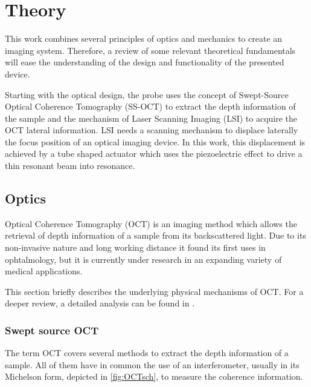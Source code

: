 
\chapter{Theory}
\label{Ch:Theory}	

This work combines several principles of optics and mechanics to create an imaging system. Therefore, a review of some relevant theoretical fundamentals will ease the understanding of the design and functionality of the presented device.

Starting with the optical design, the probe uses the concept of Swept-Source Optical Coherence Tomography (SS-OCT) to extract the depth information of the sample and the mechanism of Laser Scanning Imaging (LSI) to acquire the OCT lateral information. LSI needs a scanning mechanism to displace laterally the focus position of an optical imaging device. In this work, this displacement is achieved by a tube shaped actuator which uses the piezoelectric effect to drive a thin resonant beam into resonance.

\section{Optics}
Optical Coherence Tomography (OCT) is an imaging method which allows the retrieval of depth information of a sample from its backscattered light.  Due to its non-invasive nature and long working distance it found its first uses in ophtalmology, but it is currently under research in an expanding variety of medical applications. 

This section briefly describes the underlying physical mechanisms of OCT. For a deeper review, a detailed analysis can be found in \cite{Drexler2008}.

\subsection{Swept source OCT}
The term OCT covers several methods to extract the depth information of a sample. All of them have in common the use of an interferometer, usually in its Michelson form, depicted in \autoref{fig:OCTsch}, to measure the coherence information.

